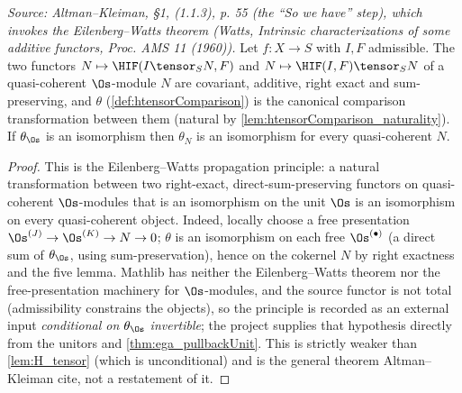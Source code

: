 \begin{theorem}
  \label{thm:ew_htensorComparison}
  \textit{Source: Altman--Kleiman, §1, (1.1.3), p. 55 (the ``So we have'' step), which invokes
  the Eilenberg--Watts theorem (Watts, \emph{Intrinsic characterizations of some additive
  functors}, Proc. AMS 11 (1960)).}
  Let $f : X \to S$ with $I, F$ admissible. The two functors $N \mapsto \HIF(I \tensor_S N, F)$
  and $N \mapsto \HIF(I,F) \tensor_S N$ of a quasi-coherent $\Os$-module $N$ are covariant,
  additive, right exact and sum-preserving, and $\theta$ (\cref{def:htensorComparison}) is the
  canonical comparison transformation between them (natural by
  \cref{lem:htensorComparison_naturality}). If $\theta_{\Os}$ is an isomorphism then $\theta_N$
  is an isomorphism for every quasi-coherent $N$.
  \begin{proof}
    This is the Eilenberg--Watts propagation principle: a natural transformation between two
    right-exact, direct-sum-preserving functors on quasi-coherent $\Os$-modules that is an
    isomorphism on the unit $\Os$ is an isomorphism on every quasi-coherent object. Indeed,
    locally choose a free presentation $\Os^{(J)} \to \Os^{(K)} \to N \to 0$; $\theta$ is an
    isomorphism on each free $\Os^{(\bullet)}$ (a direct sum of $\theta_{\Os}$, using
    sum-preservation), hence on the cokernel $N$ by right exactness and the five lemma. Mathlib
    has neither the Eilenberg--Watts theorem nor the free-presentation machinery for
    $\Os$-modules, and the source functor is not total (admissibility constrains the objects), so
    the principle is recorded as an external input \emph{conditional on $\theta_{\Os}$ invertible};
    the project supplies that hypothesis directly from the unitors and
    \cref{thm:ega_pullbackUnit}. This is strictly weaker than \cref{lem:H_tensor} (which is
    unconditional) and is the general theorem Altman--Kleiman cite, not a restatement of it.
  \end{proof}
\end{theorem}

